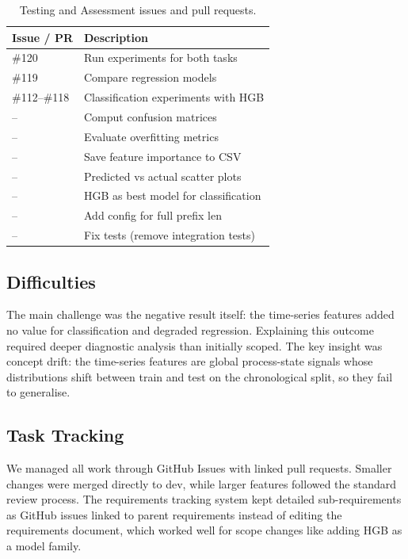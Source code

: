 \documentclass[runningheads]{llncs}
\begin{document}
\begin{table}[H]
    \centering
    \caption{Testing and Assessment issues and pull requests.}
    \label{tab:issues}
    \begin{tabularx}{0.85\textwidth}{lX}
        \toprule
        \textbf{Issue / PR} & \textbf{Description}                                            \\
        \midrule
        \#120               & Run experiments for both tasks                                  \\
        \#119               & Compare regression models                                       \\
        \#112--\#118        & Classification experiments with HGB                              \\
        --                  & Comput confusion matrices                                       \\
        --                  & Evaluate overfitting metrics                                    \\
        --                  & Save feature importance to CSV                                  \\
        --                  & Predicted vs actual scatter plots                               \\
        --                  & HGB as best model for classification                            \\
        --                  & Add config for full prefix len                                  \\
        --                  & Fix tests (remove integration tests)                            \\
        \bottomrule
    \end{tabularx}
\end{table}

\subsection{Difficulties}
The main challenge was the negative result itself: the time-series features added no
value for classification and degraded regression. Explaining this outcome required
deeper diagnostic analysis than initially scoped. The key insight was concept drift:
the time-series features are global process-state signals whose distributions shift
between train and test on the chronological split, so they fail to generalise.

\subsection{Task Tracking}
We managed all work through GitHub Issues with linked pull requests. Smaller changes
were merged directly to dev, while larger features followed the standard review
process. The requirements tracking system kept detailed sub-requirements as GitHub
issues linked to parent requirements instead of editing the requirements document,
which worked well for scope changes like adding HGB as a model family.
\end{document}
